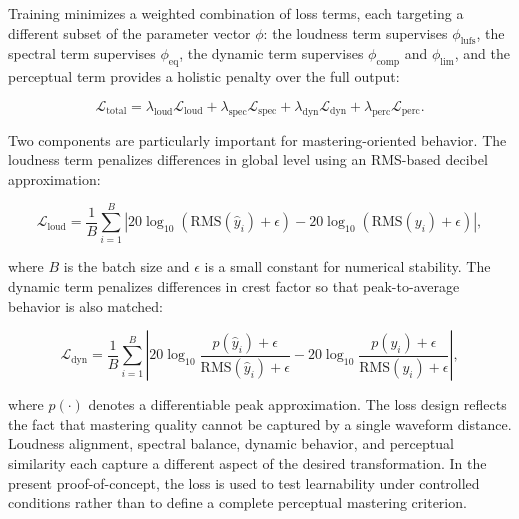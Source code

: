 \documentclass[journal]{IEEEtran}
\begin{document}
Training minimizes a weighted combination of loss terms, each targeting a different subset of the parameter vector $\phi$: the loudness term supervises $\phi_{\mathrm{lufs}}$, the spectral term supervises $\phi_{\mathrm{eq}}$, the dynamic term supervises $\phi_{\mathrm{comp}}$ and $\phi_{\mathrm{lim}}$, and the perceptual term provides a holistic penalty over the full output:
\begin{strip}
\begin{equation}
\mathcal{L}_{\mathrm{total}} =
\lambda_{\mathrm{loud}}\mathcal{L}_{\mathrm{loud}}+
\lambda_{\mathrm{spec}}\mathcal{L}_{\mathrm{spec}}+
\lambda_{\mathrm{dyn}}\mathcal{L}_{\mathrm{dyn}}+
\lambda_{\mathrm{perc}}\mathcal{L}_{\mathrm{perc}}.
\end{equation}
\end{strip}
Two components are particularly important for mastering-oriented behavior. The loudness term penalizes differences in global level using an RMS-based decibel approximation:
\begin{strip}
\begin{equation}
\mathcal{L}_{\mathrm{loud}} = \frac{1}{B}\sum_{i=1}^{B}\left|20\log_{10}(\mathrm{RMS}(\hat{y}_i)+\epsilon)-20\log_{10}(\mathrm{RMS}(y_i)+\epsilon)\right|,
\end{equation}
\end{strip}
where $B$ is the batch size and $\epsilon$ is a small constant for numerical stability. The dynamic term penalizes differences in crest factor so that peak-to-average behavior is also matched:
\begin{strip}
\begin{equation}
\mathcal{L}_{\mathrm{dyn}} = \frac{1}{B}\sum_{i=1}^{B}\left|20\log_{10}\frac{p(\hat{y}_i)+\epsilon}{\mathrm{RMS}(\hat{y}_i)+\epsilon}-20\log_{10}\frac{p(y_i)+\epsilon}{\mathrm{RMS}(y_i)+\epsilon}\right|,
\end{equation}
\end{strip}
where $p(\cdot)$ denotes a differentiable peak approximation.
The loss design reflects the fact that mastering quality cannot be captured by a single waveform distance. Loudness alignment, spectral balance, dynamic behavior, and perceptual similarity each capture a different aspect of the desired transformation. In the present proof-of-concept, the loss is used to test learnability under controlled conditions rather than to define a complete perceptual mastering criterion.
\end{document}
